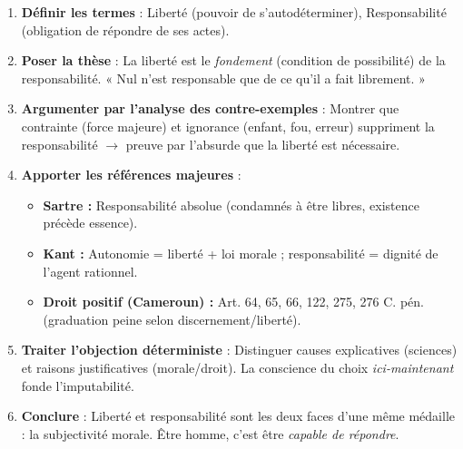 \documentclass[11pt]{article}
\newcommand{\cle}[1]{{\popxbold\color{popdark}#1}}
\begin{document}
\begin{methode}
\begin{enumerate}
    \item \textbf{Définir les termes} : Liberté (pouvoir de s'autodéterminer), Responsabilité (obligation de répondre de ses actes).
    \item \textbf{Poser la thèse} : La liberté est le \emph{fondement} (condition de possibilité) de la responsabilité. « Nul n'est responsable que de ce qu'il a fait librement. »
    \item \textbf{Argumenter par l'analyse des contre-exemples} : Montrer que contrainte (force majeure) et ignorance (enfant, fou, erreur) suppriment la responsabilité $\rightarrow$ preuve par l'absurde que la liberté est nécessaire.
    \item \textbf{Apporter les références majeures} :
        \begin{itemize}
            \item \textbf{Sartre :} Responsabilité absolue (condamnés à être libres, existence précède essence).
            \item \textbf{Kant :} Autonomie = liberté + loi morale ; responsabilité = dignité de l'agent rationnel.
            \item \textbf{Droit positif (Cameroun) :} Art. 64, 65, 66, 122, 275, 276 C. pén. (graduation peine selon discernement/liberté).
        \end{itemize}
    \item \textbf{Traiter l'objection déterministe} : Distinguer causes explicatives (sciences) et raisons justificatives (morale/droit). La conscience du choix \emph{ici-maintenant} fonde l'imputabilité.
    \item \textbf{Conclure} : Liberté et responsabilité sont les deux faces d'une même médaille : la \cle{subjectivité morale}. Être homme, c'est être \emph{capable de répondre}.
\end{enumerate}
\end{methode}
\end{document}
